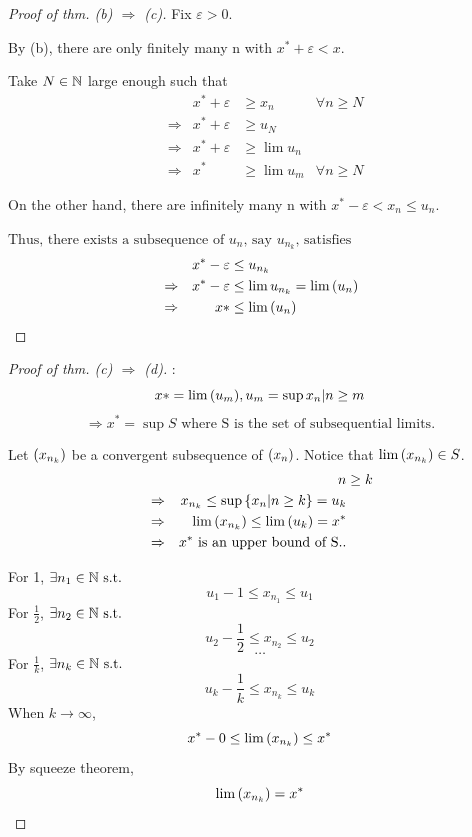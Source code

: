 \documentclass[a4paper,12pt]{article}
\begin{document}
\begin{theorem}
    \begin{proof}[Proof of thm. (b) \(\Rightarrow\) (c)]
        Fix \(\varepsilon>0\).

        By (b), there are only finitely many n with \(x^*+\varepsilon<x\).

        Take \(N\in\mathbb{N}\) large enough such that
        \begin{align*}
            &&x^*+\varepsilon&\ge x_n&\forall n\ge N\\
            &\Rightarrow&x^*+\varepsilon &\ge u_N\\
            &\Rightarrow&x^*+\varepsilon &\ge \lim{u_n}\\
            &\Rightarrow&x^* &\ge \lim{u_m} &\forall n\ge N
        \end{align*}

        On the other hand, there are infinitely many n with \(x^*-\varepsilon<x_n\le u_n\).

        \(\text{Thus, there exists a subsequence of }u_n\text{, say }u_{n_k}\text{, satisfies}\)
        \begin{align*}
            &&x^*-\varepsilon&\le u_{n_k}\\
            &\Rightarrow &x^*-\varepsilon &\le \lim{u_{n_k}}=\lim{(u_{n})}\\
            &\Rightarrow &x*&\le \lim{(u_{n})}
        \end{align*}
    \end{proof}

    \begin{proof}[Proof of thm. (c) \(\Rightarrow\) (d)]
        :
        \[x*=\lim{(u_{m})}, u_m=\sup{x_n|n\ge m}\]
        \[\Rightarrow x^*=\sup{S} \text{ where S is the set of subsequential limits.}\]

        Let \((x_{n_k})\) be a convergent subsequence of \((x_{n})\). Notice that \(\lim{(x_{n_k})}\in S\).
        \begin{align*}
            &&n&\ge k\\
            &\Rightarrow&x_{n_k} \le \sup{\{x_n|n\ge k\}}=u_k\\
            &\Rightarrow&\lim{(x_{n_k})} \le \lim{(u_{k})}=x^*\\
            &\Rightarrow&x^* \text{ is an upper bound of S.}.
        \end{align*}

        For 1, \(\exists n_1\in\mathbb{N} \text{ s.t. }\)
        \[u_1-1\le x_{n_1}\le u_1\]
        For \(\frac{1}{2}\), \(\exists n_2\in\mathbb{N} \text{ s.t. }\)
        \[u_2-\frac{1}{2}\le x_{n_2}\le u_2\]
        \[\dots\]
        For \(\frac{1}{k}\), \(\exists n_k\in\mathbb{N} \text{ s.t. }\)
        \[u_k-\frac{1}{k}\le x_{n_k}\le u_k\]
        When \(k\rightarrow \infty\),
        \[x^*-0\le \lim{(x_{n_k})}\le x^*\]
        By squeeze theorem,
        \[\lim{(x_{n_k})}=x^*\]
    \end{proof}


\end{theorem}
\end{document}
